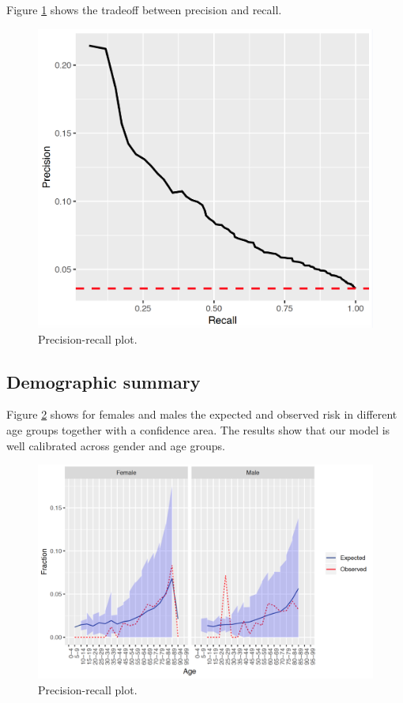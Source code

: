 \documentclass[11pt]{book}
\begin{document}
Figure \ref{fig:plpPrecisionRecall} shows the tradeoff between precision
and recall.

\begin{figure}

{\centering \includegraphics[width=0.8\linewidth]{images/PatientLevelPrediction/precisionRecall} 

}

\caption{Precision-recall plot.}\label{fig:plpPrecisionRecall}
\end{figure}

\subsection{Demographic summary}\label{demographic-summary}

Figure \ref{fig:plpDemoSummary} shows for females and males the expected
and observed risk in different age groups together with a confidence
area. The results show that our model is well calibrated across gender
and age groups.

\begin{figure}

{\centering \includegraphics[width=1\linewidth]{images/PatientLevelPrediction/demographicSummary} 

}

\caption{Precision-recall plot.}\label{fig:plpDemoSummary}
\end{figure}
\end{document}
